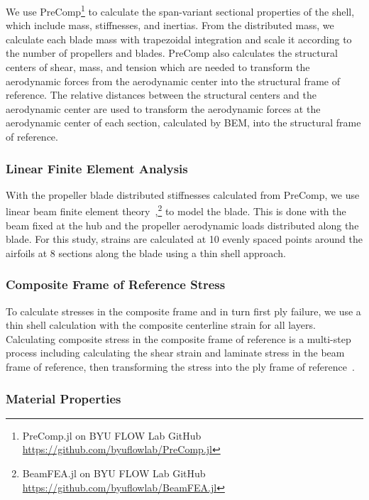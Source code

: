 \documentclass[conf]{new-aiaa}
\begin{document}
We use PreComp\footnote{PreComp.jl on BYU FLOW Lab GitHub \href{https://github.com/byuflowlab/PreComp.jl}{https://github.com/byuflowlab/PreComp.jl}} to calculate the span-variant sectional properties of the shell, which include mass, stiffnesses, and inertias. From the distributed mass, we calculate each blade mass with trapezoidal integration and scale it according to the number of propellers and blades. PreComp also calculates the structural centers of shear, mass, and tension which are needed to transform the aerodynamic forces from the aerodynamic center into the structural frame of reference. The relative distances between the structural centers and the aerodynamic center are used to transform the aerodynamic forces at the aerodynamic center of each section, calculated by BEM, into the structural frame of reference.

\subsubsection{Linear Finite Element Analysis}


With the propeller blade distributed stiffnesses calculated from PreComp, we use linear beam finite element theory~\cite{pbeam},\footnote{BeamFEA.jl on BYU FLOW Lab GitHub \href{https://github.com/byuflowlab/BeamFEA.jl}{https://github.com/byuflowlab/BeamFEA.jl}} to model the blade. This is done with the beam fixed at the hub and the propeller aerodynamic loads distributed along the blade. For this study, strains are calculated at 10 evenly spaced points around the airfoils at 8 sections along the blade using a thin shell approach.

\subsubsection{Composite Frame of Reference Stress}


To calculate stresses in the composite frame and in turn first ply failure, we use a thin shell calculation with the composite centerline strain for all layers. Calculating composite stress in the composite frame of reference is a multi-step process including calculating the shear strain and laminate stress in the beam frame of reference, then transforming the stress into the ply frame of reference~\cite{Kassapoglou:2013aa}.

\subsubsection{Material Properties}
\end{document}
